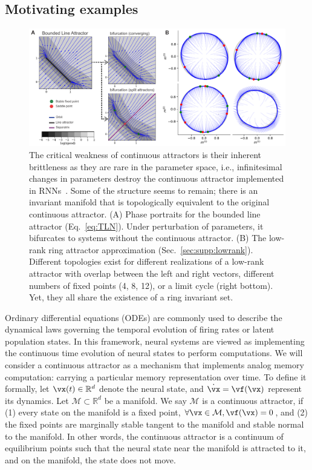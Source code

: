 \documentclass{article} %
\newcounter{ct}
\newcommand{\reals}{\mathbb{R}}
\newcommand{\manifold}{\mathcal{M}}
\theoremstyle{definition}
\theoremstyle{remark}
\renewcommand{\cite}{\citep}
\begin{document}
\subsection{Motivating examples}\label{sec:motivating}
\begin{figure}[tbhp]
  \centering
  \includegraphics[width=\textwidth]{lara_bifurcations}
  \caption{The critical weakness of continuous attractors is their inherent brittleness as they are rare in the parameter space, i.e., infinitesimal changes in parameters destroy the continuous attractor implemented in RNNs~\cite{seung1996,Renart2003}.
  Some of the structure seems to remain; there is an invariant manifold that is topologically equivalent to the original continuous attractor.
    (A) Phase portraits for the bounded line attractor (Eq.~\eqref{eq:TLN}).
    Under perturbation of parameters, it bifurcates to systems without the continuous attractor.
    (B) The low-rank ring attractor approximation (Sec.~\eqref{sec:supp:lowrank}).
    Different topologies exist for different realizations of a low-rank attractor with overlap between the left and right vectors, different numbers of fixed points (4, 8, 12), or a limit cycle (right bottom).
    Yet, they all share the existence of a ring invariant set.
}\label{fig:lara_bifurcations}
\end{figure}


Ordinary differential equations (ODEs) are commonly used to describe the dynamical laws governing the temporal evolution of firing rates or latent population states\cite{vyas2020}.
In this framework, neural systems are viewed as implementing the continuous time evolution of neural states to perform computations.
We will consider a continuous attractor as a mechanism that implements analog memory computation: carrying a particular memory representation over time.
To define it formally, let \(\vx(t) \in \reals^d\) denote the neural state, and \(\dot{\vx} = \vf(\vx)\) represent its dynamics.
Let \(\manifold \subset \reals^d\) be a manifold.
We say \(\manifold\) is a continuous attractor, if (1) every state on the manifold is a fixed point, \(\forall \vx \in \manifold, \vf(\vx) = 0\), and (2) the fixed points are marginally stable tangent to the manifold and stable normal to the manifold.
In other words, the continuous attractor is a continuum of equilibrium points such that the neural state near the manifold is attracted to it, and on the manifold, the state does not move.
\end{document}
